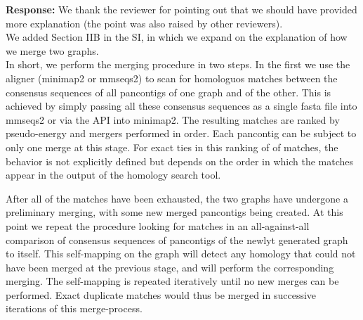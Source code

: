 \documentclass[aps,rmp,onecolumn]{revtex4-1}
\newcommand{\response}[1]{{\it {\color{response}\textbf{Response:} #1}}\vskip 5mm}
\newcommand{\SIalgo}{II}
\begin{document}
\response{We thank the reviewer for pointing out that we should have provided more explanation (the point was also raised by other reviewers).\\
We added Section {\SIalgo}B in the SI, in which we expand on the explanation of how we merge two graphs.\\
In short, we perform the merging procedure in two steps. In the first we use the aligner (minimap2 or mmseqs2) to scan for homologuos matches between the consensus sequences of all pancontigs of one graph and of the other.
This is achieved by simply passing all these consensus sequences as a single fasta file into mmseqs2 or via the API into minimap2.
The resulting matches are ranked by pseudo-energy and mergers performed in order.
Each pancontig can be subject to only one merge at this stage.
For exact ties in this ranking of of matches, the behavior is not explicitly defined but depends on the order in which the matches appear in the output of the homology search tool. 

After all of the matches have been exhausted, the two graphs have undergone a preliminary merging, with some new merged pancontigs being created. 
At this point we repeat the procedure looking for matches in an all-against-all comparison of consensus sequences of pancontigs of the newlyt generated graph to itself. 
This self-mapping on the graph will detect any homology that could not have been merged at the previous stage, and will perform the corresponding merging. 
The self-mapping is repeated iteratively until no new merges can be performed.
Exact duplicate matches would thus be merged in successive iterations of this merge-process.
}
\end{document}
